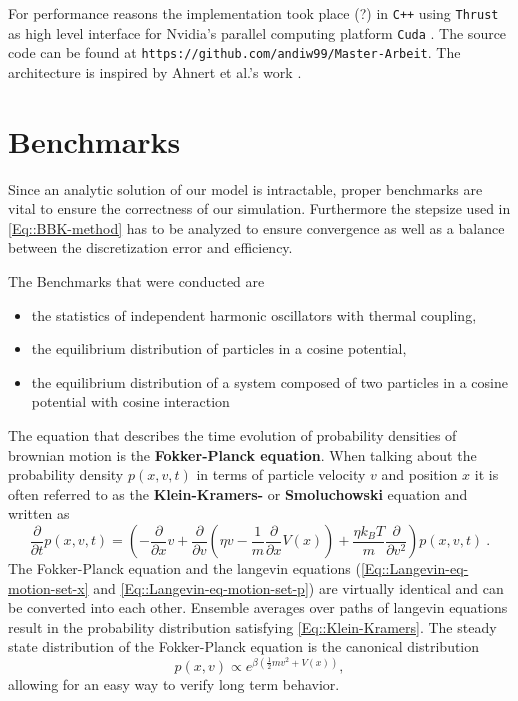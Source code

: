 	For performance reasons the implementation took place (?) in \texttt{C++} using \texttt{Thrust} \cite{thrust} as high level interface for Nvidia's parallel computing platform \texttt{Cuda} \cite{cuda}. The source code can be found at \texttt{https://github.com/andiw99/Master-Arbeit}. The architecture is inspired by Ahnert et al.'s work \cite{ahnert2014solving}.
	\section{Benchmarks}
	Since an analytic solution of our model is intractable, proper benchmarks are vital to ensure the correctness of our simulation. Furthermore the stepsize used in \autoref{Eq::BBK-method} has to be analyzed to ensure convergence as well as a balance between the discretization error and efficiency.
	
	The Benchmarks that were conducted are   
	\begin{itemize}
		\item the statistics of independent harmonic oscillators with thermal coupling,
		\item the equilibrium distribution of particles in a cosine potential,
		\item the equilibrium distribution of a system composed of two particles in a cosine potential with cosine interaction
	\end{itemize}			
	The equation that describes the time evolution of probability densities of brownian motion is the \textbf{Fokker-Planck equation}. When talking about the probability density $p(x, v, t)$ in terms of particle velocity $v$ and position $x$ it is often referred to as the \textbf{Klein-Kramers-} or \textbf{Smoluchowski} equation and written as
	\begin{equation} \label{Eq::Klein-Kramers}
		\frac{\partial}{\partial t} p(x, v, t) = \left(-\frac{\partial}{\partial x} v + \frac{\partial}{\partial v} \left(\eta v - \frac{1}{m} \frac{\partial}{\partial x} V(x) \right) + \frac{\eta k_B T}{m} \frac{\partial}{\partial v^2}\right)p(x, v, t) ~.
	\end{equation}
	The Fokker-Planck equation and the langevin equations (\autoref{Eq::Langevin-eq-motion-set-x} and \autoref{Eq::Langevin-eq-motion-set-p}) are virtually identical and can be converted into each other. Ensemble averages over paths of langevin equations result in the probability distribution satisfying \autoref{Eq::Klein-Kramers}. The steady state distribution of the Fokker-Planck equation is the canonical distribution
	\begin{equation} \label{Eq::Canonical-Dist}
		p(x, v) \propto e^{\beta \left( \tfrac{1}{2} m v^2 + V(x)\right)},	
	\end{equation}
	allowing for an easy way to verify long term behavior.  
